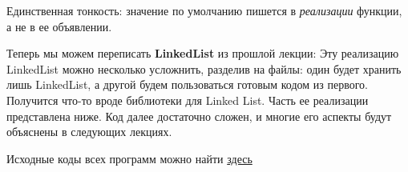 \begin{lecture}[\lectureSubject]
\begin{lecSection}
		Единственная тонкость: значение по умолчанию пишется в \textit{реализации} функции, а не в ее объявлении.
	\end{lecSection}
	\begin{lecSection}
		Теперь мы можем переписать \textbf{LinkedList} из прошлой лекции:
		Эту реализацию LinkedList можно несколько усложнить, разделив на файлы: один будет хранить лишь LinkedList, а другой будем пользоваться готовым кодом из первого. Получится что-то вроде библиотеки для Linked List. Часть ее реализации представлена ниже. Код далее достаточно сложен, и многие его аспекты будут объяснены в следующих лекциях.
		\begin{center}
			{Исходные коды всех программ можно найти \href{https://github.com/alekseik1/cpp\_lections\_2017/tree/master/lection\%206}{здесь}}
		\end{center}
	\end{lecSection}
\end{lecture}
